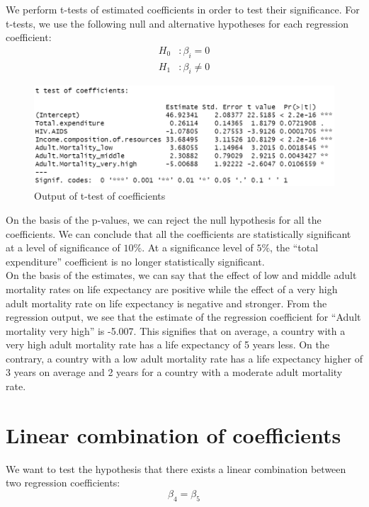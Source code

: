 We perform t-tests of estimated coefficients in order to test their significance. For t-tests, we use the following null and alternative hypotheses for each regression coefficient: 
\begin{align*}
	H_0&: \beta_i = 0 \\
	H_1&: \beta_i \neq 0
\end{align*}

\begin{figure}[H]
	\centering
	\includegraphics{figures/hypothesis_testing/test_t_coefficients_robust_inference.PNG}
	\caption{Output of t-test of coefficients}
\end{figure}

On the basis of the p-values, we can reject the null hypothesis for all the coefficients. We can conclude that all the coefficients are statistically significant at a level of significance of $10\%$. At a significance level of $5\%$, the “total expenditure” coefficient is no longer statistically significant. \\

On the basis of the estimates, we can say that the effect of low and middle adult mortality rates on life expectancy are positive while the effect of a very high adult mortality rate on life expectancy is negative and stronger. From the regression output, we see that the estimate of the regression coefficient for “Adult mortality very high” is -5.007. This signifies that on average, a country with a very high adult mortality rate has a life expectancy of 5 years less. On the contrary, a country with a low  adult mortality rate has a life expectancy higher of 3 years on average and 2 years for a country with a moderate adult mortality rate. 

\section{Linear combination  of coefficients}

 We want to test the hypothesis that there exists a linear combination between two regression coefficients: 
 \begin{equation*}
     \beta_4 = \beta_5
 \end{equation*} 

